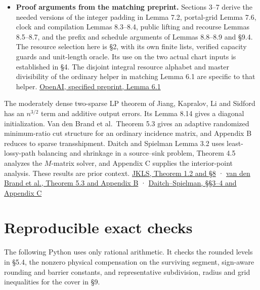 \documentclass[11pt]{article}
\begin{document}
\begin{itemize}
\item
  \textbf{Proof arguments from the matching preprint.} Sections 3--7 derive the needed versions of the integer padding in Lemma 7.2, portal-grid Lemma 7.6, clock and compilation Lemmas 8.3--8.4, public lifting and recourse Lemmas 8.5--8.7, and the prefix and schedule arguments of Lemmas 8.8--8.9 and §9.4. The resource selection here is §2, with its own finite lists, verified capacity guards and unit-length oracle. Its use on the two actual chart inputs is established in §4. The disjoint integral resource alphabet and master divisibility of the ordinary helper in matching Lemma 6.1 are specific to that helper. \href{https://raw.githubusercontent.com/openai/math/adc7f1241b42e322a6451854ab7e4b4c146bf78a/preprints/Almost-Linear-Time-Maximum-Cardinality-Matching-in-Sparse-General-Graphs-September-24-2026/main.pdf\#page=41}{OpenAI, specified preprint, Lemma 6.1}
\end{itemize}

The moderately dense two-sparse LP theorem of Jiang, Kapralov, Li and Sidford has an \(n^{3/2}\) term and additive output errors. Its Lemma 8.14 gives a diagonal initialization. Van den Brand et al.~Theorem 5.3 gives an adaptive randomized minimum-ratio cut structure for an ordinary incidence matrix, and Appendix B reduces to sparse transshipment. Daitch and Spielman Lemma 3.2 uses least-lossy-path balancing and shrinkage in a source--sink problem, Theorem 4.5 analyzes the \(M\)-matrix solver, and Appendix C supplies the interior-point analysis. These results are prior context. \href{https://arxiv.org/abs/2510.17740v1}{JKLS, Theorem 1.2 and §8} · \href{https://arxiv.org/abs/2407.10830v1}{van den Brand et al., Theorem 5.3 and Appendix B} · \href{https://arxiv.org/abs/0803.0988v2}{Daitch--Spielman, §§3--4 and Appendix C}

\hypertarget{reproducible-exact-checks}{%
\section{Reproducible exact checks}\label{reproducible-exact-checks}}

The following Python uses only rational arithmetic. It checks the rounded levels in §5.4, the nonzero physical compensation on the surviving segment, sign-aware rounding and barrier constants, and representative subdivision, radius and grid inequalities for the cover in §9.
\end{document}
